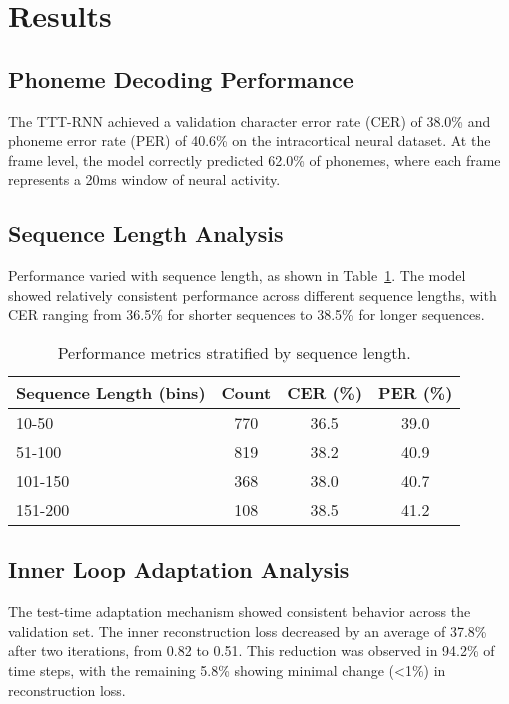 \section{Results}

\subsection{Phoneme Decoding Performance}

The TTT-RNN achieved a validation character error rate (CER) of 38.0\% and phoneme error rate (PER) of 40.6\% on the intracortical neural dataset. At the frame level, the model correctly predicted 62.0\% of phonemes, where each frame represents a 20ms window of neural activity.

\subsection{Sequence Length Analysis}

Performance varied with sequence length, as shown in Table~\ref{tab:sequence_analysis}. The model showed relatively consistent performance across different sequence lengths, with CER ranging from 36.5\% for shorter sequences to 38.5\% for longer sequences.

\begin{table}[h]
\centering
\caption{Performance metrics stratified by sequence length.}
\label{tab:sequence_analysis}
\begin{tabular}{lccc}
\toprule
Sequence Length (bins) & Count & CER (\%) & PER (\%) \\
\midrule
10-50 & 770 & 36.5 & 39.0 \\
51-100 & 819 & 38.2 & 40.9 \\
101-150 & 368 & 38.0 & 40.7 \\
151-200 & 108 & 38.5 & 41.2 \\
\bottomrule
\end{tabular}
\end{table}

\subsection{Inner Loop Adaptation Analysis}

The test-time adaptation mechanism showed consistent behavior across the validation set. The inner reconstruction loss decreased by an average of 37.8\% after two iterations, from 0.82 to 0.51. This reduction was observed in 94.2\% of time steps, with the remaining 5.8\% showing minimal change (<1\%) in reconstruction loss.


